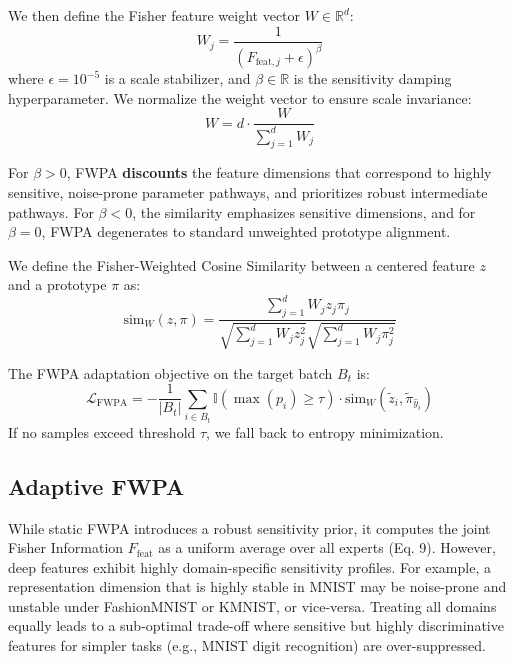 \documentclass{article}
\theoremstyle{plain}
\theoremstyle{definition}
\theoremstyle{remark}
\begin{document}
We then define the Fisher feature weight vector $W \in \mathbb{R}^d$:
\begin{equation}
    W_j = \frac{1}{(F_{\text{feat}, j} + \epsilon)^\beta}
\end{equation}
where $\epsilon = 10^{-5}$ is a scale stabilizer, and $\beta \in \mathbb{R}$ is the sensitivity damping hyperparameter. We normalize the weight vector to ensure scale invariance:
\begin{equation}
    W = d \cdot \frac{W}{\sum_{j=1}^d W_j}
\end{equation}

For $\beta > 0$, FWPA \textbf{discounts} the feature dimensions that correspond to highly sensitive, noise-prone parameter pathways, and prioritizes robust intermediate pathways. For $\beta < 0$, the similarity emphasizes sensitive dimensions, and for $\beta = 0$, FWPA degenerates to standard unweighted prototype alignment.

We define the Fisher-Weighted Cosine Similarity between a centered feature $z$ and a prototype $\pi$ as:
\begin{equation}
    \text{sim}_W(z, \pi) = \frac{\sum_{j=1}^d W_j z_j \pi_j}{\sqrt{\sum_{j=1}^d W_j z_j^2} \sqrt{\sum_{j=1}^d W_j \pi_j^2}}
\end{equation}

The FWPA adaptation objective on the target batch $B_t$ is:
\begin{equation}
    \mathcal{L}_{\text{FWPA}} = -\frac{1}{|B_t|} \sum_{i \in B_t} \mathbb{I}(\max(p_i) \ge \tau) \cdot \text{sim}_W(\tilde{z}_i, \tilde{\pi}_{\hat{y}_i})
\end{equation}
If no samples exceed threshold $\tau$, we fall back to entropy minimization.

\subsection{Adaptive FWPA}
While static FWPA introduces a robust sensitivity prior, it computes the joint Fisher Information $F_{\text{feat}}$ as a uniform average over all experts (Eq. 9). However, deep features exhibit highly domain-specific sensitivity profiles. For example, a representation dimension that is highly stable in MNIST may be noise-prone and unstable under FashionMNIST or KMNIST, or vice-versa. Treating all domains equally leads to a sub-optimal trade-off where sensitive but highly discriminative features for simpler tasks (e.g., MNIST digit recognition) are over-suppressed.
\end{document}
